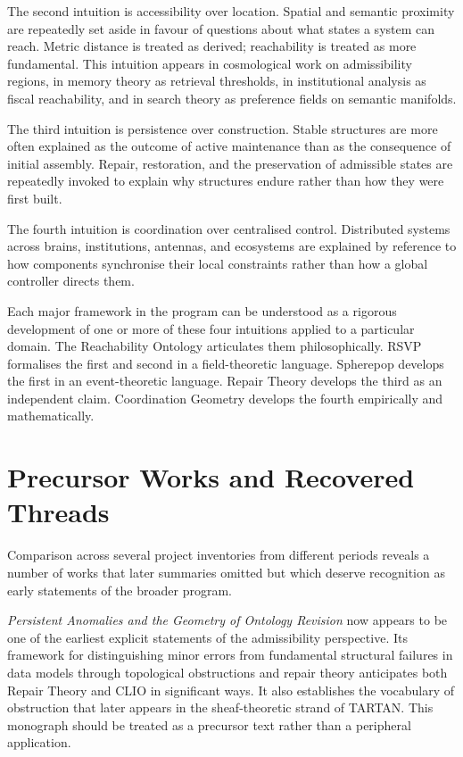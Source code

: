 \documentclass[12pt, twoside]{article}
\begin{document}
The second intuition is accessibility over location. Spatial and semantic
proximity are repeatedly set aside in favour of questions about what states a
system can reach. Metric distance is treated as derived; reachability is
treated as more fundamental. This intuition appears in cosmological work on
admissibility regions, in memory theory as retrieval thresholds, in
institutional analysis as fiscal reachability, and in search theory as
preference fields on semantic manifolds.

The third intuition is persistence over construction. Stable structures are
more often explained as the outcome of active maintenance than as the
consequence of initial assembly. Repair, restoration, and the preservation of
admissible states are repeatedly invoked to explain why structures endure
rather than how they were first built.

The fourth intuition is coordination over centralised control. Distributed
systems across brains, institutions, antennas, and ecosystems are explained
by reference to how components synchronise their local constraints rather than
how a global controller directs them.

Each major framework in the program can be understood as a rigorous
development of one or more of these four intuitions applied to a particular
domain. The Reachability Ontology articulates them philosophically. RSVP
formalises the first and second in a field-theoretic language. Spherepop
develops the first in an event-theoretic language. Repair Theory develops the
third as an independent claim. Coordination Geometry develops the fourth
empirically and mathematically.

\section{Precursor Works and Recovered Threads}

Comparison across several project inventories from different periods reveals
a number of works that later summaries omitted but which deserve recognition
as early statements of the broader program.

\emph{Persistent Anomalies and the Geometry of Ontology Revision} now
appears to be one of the earliest explicit statements of the admissibility
perspective. Its framework for distinguishing minor errors from fundamental
structural failures in data models through topological obstructions and
repair theory anticipates both Repair Theory and CLIO in significant ways.
It also establishes the vocabulary of obstruction that later appears in the
sheaf-theoretic strand of TARTAN. This monograph should be treated as a
precursor text rather than a peripheral application.
\end{document}
